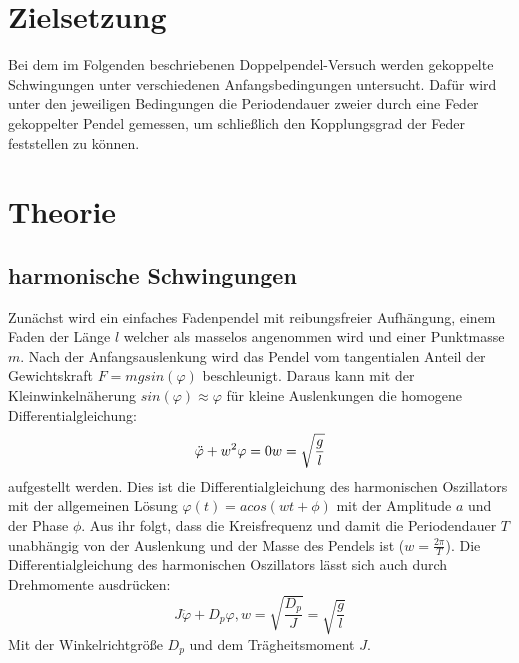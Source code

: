 
\section{Zielsetzung}
\label{sec:Theorie}
Bei dem im Folgenden beschriebenen Doppelpendel-Versuch werden gekoppelte Schwingungen unter verschiedenen Anfangsbedingungen untersucht. Dafür wird unter den jeweiligen Bedingungen die Periodendauer zweier durch eine Feder gekoppelter Pendel gemessen, um schließlich den Kopplungsgrad der Feder feststellen zu können.
\section{Theorie}
\subsection{harmonische Schwingungen}
Zunächst wird ein einfaches Fadenpendel mit reibungsfreier Aufhängung, einem Faden der Länge $l$ 
welcher als masselos angenommen wird und einer Punktmasse $m$. Nach der Anfangsauslenkung wird das 
Pendel vom tangentialen Anteil der Gewichtskraft $F=mgsin(\varphi)$ beschleunigt.
Daraus kann mit der Kleinwinkelnäherung $sin(\varphi)\approx\varphi$ für kleine Auslenkungen die 
homogene Differentialgleichung:
\begin{equation}
\ddot{\varphi}+w^2\varphi=0\\
w=\sqrt{\frac{g}{l}}
\end{equation}
aufgestellt werden.\newline
Dies ist die Differentialgleichung des harmonischen Oszillators mit der allgemeinen Lösung 
$\varphi(t)=acos(wt+\phi)$ mit der Amplitude $a$ und der Phase $\phi$. Aus ihr folgt, dass 
die  Kreisfrequenz und damit die Periodendauer $T$ unabhängig von der Auslenkung und der Masse 
des Pendels ist ($w=\frac{2\pi}{T}$). Die Differentialgleichung des harmonischen Oszillators lässt 
sich auch durch Drehmomente ausdrücken: 
\begin{equation}
J\ddot{\varphi}+D_p\varphi, w=\sqrt{\frac{D_p}{J}}=\sqrt{\frac{g}{l}}
\end{equation}
Mit der Winkelrichtgröße $D_p$ und dem Trägheitsmoment $J$.
